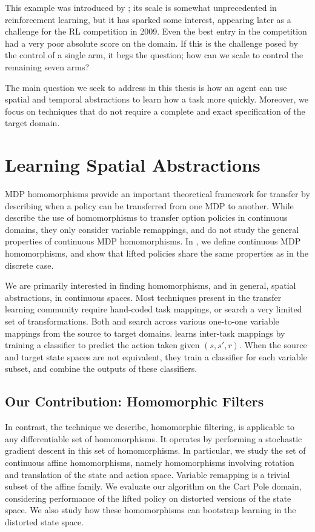 This example was introduced by \citet{Engel2006}; its scale is somewhat
unprecedented in reinforcement learning, but it has sparked some
interest, appearing later as a challenge for the RL competition in 2009.
Even the best entry in the competition had a very poor absolute score on
the domain. If this is the challenge posed by the control of a single
arm, it begs the question; how can we scale to control the remaining
seven arms?

The main question we seek to address in this thesis is how an agent
can use spatial and temporal abstractions to learn how a task more
quickly. Moreover, we focus on techniques that do not require
a complete and exact specification of the target domain.

\section{Learning Spatial Abstractions}

MDP homomorphisms \citep{Ravindran2004} provide an important theoretical
framework for transfer by describing when a policy can be transferred
from one MDP to another. While \citet{Soni2006} describe the use of
homomorphisms to transfer option policies in continuous domains, they
only consider variable remappings, and do not study the general
properties of continuous MDP homomorphisms. In
, we define continuous MDP
homomorphisms, and show that lifted policies share the same properties
as in the discrete case.

We are primarily interested in finding homomorphisms, and in general,
spatial abstractions, in continuous spaces. Most techniques present in
the transfer learning community require hand-coded task mappings, or
search a very limited set of transformations. Both \citet{Soni2006} and
\citet{Taylor2008c} search across various one-to-one variable mappings
from the source to target domains. \citet{Taylor2007b} learns inter-task
mappings by training a classifier to predict the action taken given
$(s,s',r)$. When the source and target state spaces are not equivalent,
they train a classifier for each variable subset, and combine the
outputs of these classifiers. 

\subsection{Our Contribution: Homomorphic Filters}

In contrast, the technique we describe, homomorphic filtering, is
applicable to any differentiable set of homomorphisms. It operates by
performing a stochastic gradient descent in this set of homomorphisms.
In particular, we study the set of continuous affine homomorphisms,
namely homomorphisms involving rotation and translation of the state and
action space. Variable remapping is a trivial subset of the affine
family. We evaluate our algorithm on the Cart Pole domain, considering
performance of the lifted policy on distorted versions of the state
space. We also study how these homomorphisms can bootstrap learning in
the distorted state space.

